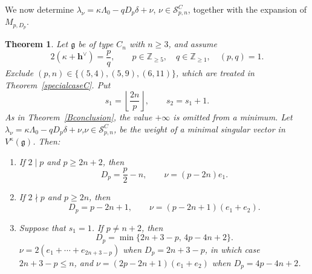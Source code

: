 \documentclass[11pt,a4paper]{amsart}
\newcommand{\ZZ}{\mathbb Z}
\theoremstyle{plain}
\newtheorem{theorem}{Theorem}[section]
\numberwithin{equation}{section}
\begin{document}
We now determine $\lambda_{\nu}=\kappa\Lambda_0-qD_p\delta+\nu$, \(\nu\in\mathcal S^C_{p,n}\), together with the expansion of \(M_{p,D_p}\).
\begin{theorem}\label{C_conclusion}
Let $\mathfrak g$ be of type $C_n$ with \(n\ge3\), and assume
\[
2(\kappa+\mathbf{h}^\vee)=\frac pq,
\qquad p\in\ZZ_{\ge5},\quad q\in\ZZ_{\ge1},\quad (p,q)=1.
\]
Exclude \((p,n)\in\{(5,4),(5,9),(6,11)\}\), which are treated in
Theorem~\ref{specialcaseC}. Put
\[
s_1=\left\lfloor\frac{2n}{p}\right\rfloor,\qquad s_2=s_1+1.
\]
As in Theorem~\ref{Bconclusion}, the value \(+\infty\) is omitted
from a minimum. Let  $\lambda_{\nu}=\kappa\Lambda_0-qD_p\delta+\nu$,$ \nu\in \mathcal S^C_{p,n}$,   be the weight of a minimal singular vector in $V^{\kappa}(\mathfrak{g})$. 
Then:
\begin{enumerate}
\item If $2\mid p$ and $p\ge2n+2$, then
\[
D_p=\frac p2-n,\qquad \nu=(p-2n)e_1.
\]
\item If $2\nmid p$ and $p\ge2n$, then
\[
D_p=p-2n+1,\qquad \nu=(p-2n+1)(e_1+e_2).
\]
\item Suppose that \(s_1=1\). If \(p\ne n+2\), then
\[
D_p=\min\{2n+3-p,\,4p-4n+2\}.
\]
\(\nu=2(e_1+\cdots+e_{2n+3-p})\) when \(D_p=2n+3-p\), in which
case \(2n+3-p\le n\), and \(\nu=(2p-2n+1)(e_1+e_2)\) when
\(D_p=4p-4n+2\).


\end{enumerate}
\end{theorem}
\end{document}
